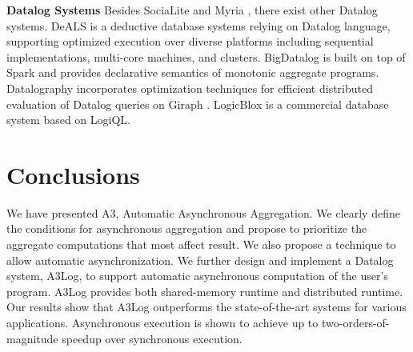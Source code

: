 \documentclass{vldb}
\begin{document}
\noindent\textbf{Datalog Systems}
Besides SociaLite \cite{Lam:2013:SDE:2510649.2511289,Seo:2013:DSD:2556549.2556572} and Myria \cite{Halperin:2014:DMB:2588555.2594530,Wang:2015:AFR:2824032.2824052}, there exist other Datalog systems. DeALS \cite{Shkapsky:2013:GQN:2536274.2536290,7113340} is a deductive database systems relying on Datalog language, supporting optimized execution over diverse platforms including sequential implementations, multi-core machines, and clusters. BigDatalog \cite{Shkapsky:2016:BDA:2882903.2915229} is built on top of Spark \cite{Zaharia:2010:SCC:1863103.1863113} and provides declarative semantics of monotonic aggregate programs. Datalography \cite{7840589} incorporates optimization techniques for efficient distributed evaluation of Datalog queries on Giraph \cite{giraph}. LogicBlox \cite{Aref:2015:DIL:2723372.2742796} is a commercial database system based on LogiQL.

\section{Conclusions}
\label{sec:conclusion}

We have presented A3, Automatic Asynchronous Aggregation. We clearly define the conditions for asynchronous aggregation and propose to prioritize the aggregate computations that most affect result. We also propose a technique to allow automatic asynchronization. We further design and implement a Datalog system, A3Log, to support automatic asynchronous computation of the user's program. A3Log provides both shared-memory runtime and distributed runtime. Our results show that A3Log outperforms the state-of-the-art systems for various applications. Asynchronous execution is shown to achieve up to two-orders-of-magnitude speedup over synchronous execution.





\end{document}
